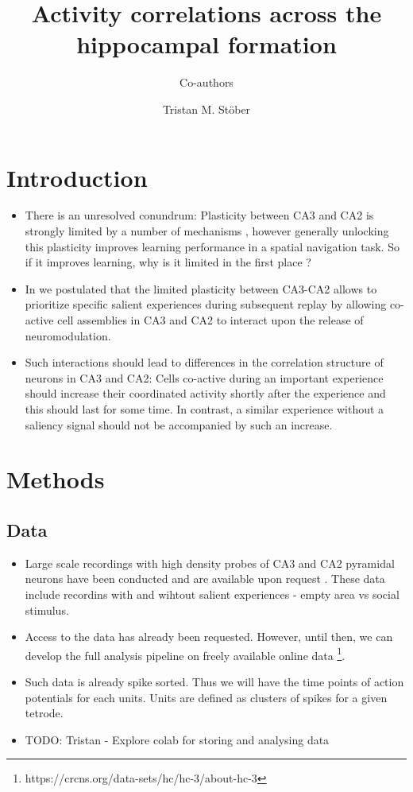 \documentclass{article}
\title{Activity correlations across the hippocampal formation}
\author[1]{Co-authors} %
\author[2,3,\Envelope]{Tristan M. St\"ober}
\affil[1]{Students IDS group 37}
\affil[2]{Institute for Neural Computation, Ruhr University Bochum, Germany}
\affil[3]{Department of Neurology, University Hospital Frankfurt, Frankfurt, Germany}
\affil[\Envelope]{Correspondence: tristan.stoeber@posteo.net}
\begin{document}
\maketitle

\section{Introduction}
\begin{itemize}
    \item There is an unresolved conundrum: Plasticity between CA3 and CA2 is strongly limited by a number of mechanisms \citep{zhao2007synaptic, lee2010rgs14, carstens2016perineuronal}, however generally unlocking this plasticity improves learning performance in a spatial navigation task\citep{lee2010rgs14}. So if it improves learning, why is it limited in the first place \citep{lehr2021ca2}?
    \item In \cite{stober2020selective} we postulated that the limited plasticity between CA3-CA2 allows to prioritize specific salient experiences during subsequent replay by allowing co-active cell assemblies in CA3 and CA2 to interact upon the release of neuromodulation.
    \item Such interactions should lead to differences in the correlation structure of neurons in CA3 and CA2: Cells co-active during an important experience should increase their coordinated activity shortly after the experience and this should last for some time. In contrast, a similar experience without a saliency signal should not be accompanied by such an increase.
    \end{itemize}

\section{Methods}
\subsection{Data}
\begin{itemize}
    \item Large scale recordings with high density probes of CA3 and CA2 pyramidal neurons have been conducted and are available upon request \citep{oliva2020hippocampal}. These data include recordins with and wihtout salient experiences - empty area vs social stimulus.
    \item Access to the data has already been requested. However, until then, we can develop the full analysis pipeline on freely available online data \citep{mizuseki2014neurosharing}\footnote{https://crcns.org/data-sets/hc/hc-3/about-hc-3}.
    \item Such data is already spike sorted. Thus we will have the time points of action potentials for each units. Units are defined as clusters of spikes for a given tetrode.
    \item TODO: Tristan - Explore colab for storing and analysing data
\end{itemize} 
\end{document}
